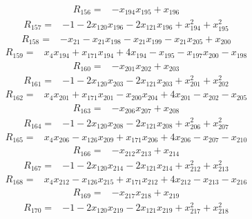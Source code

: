 \[\begin{aligned}R_{156}={}&-x_{194}x_{195}+x_{196}
\end{aligned}\]
\[\begin{aligned}R_{157}={}&-1-2x_{120}x_{196}-2x_{121}x_{196}+x_{194}^{2}+x_{195}^{2}
\end{aligned}\]
\[\begin{aligned}R_{158}={}&-x_{21}-x_{21}x_{198}-x_{21}x_{199}-x_{21}x_{205}+x_{200}
\end{aligned}\]
\[\begin{aligned}R_{159}={}&x_{4}x_{194}+x_{171}x_{194}+4x_{194}-x_{195}-x_{197}x_{200}-x_{198}
\end{aligned}\]
\[\begin{aligned}R_{160}={}&-x_{201}x_{202}+x_{203}
\end{aligned}\]
\[\begin{aligned}R_{161}={}&-1-2x_{120}x_{203}-2x_{121}x_{203}+x_{201}^{2}+x_{202}^{2}
\end{aligned}\]
\[\begin{aligned}R_{162}={}&x_{4}x_{201}+x_{171}x_{201}-x_{200}x_{204}+4x_{201}-x_{202}-x_{205}
\end{aligned}\]
\[\begin{aligned}R_{163}={}&-x_{206}x_{207}+x_{208}
\end{aligned}\]
\[\begin{aligned}R_{164}={}&-1-2x_{120}x_{208}-2x_{121}x_{208}+x_{206}^{2}+x_{207}^{2}
\end{aligned}\]
\[\begin{aligned}R_{165}={}&x_{4}x_{206}-x_{126}x_{209}+x_{171}x_{206}+4x_{206}-x_{207}-x_{210}
\end{aligned}\]
\[\begin{aligned}R_{166}={}&-x_{212}x_{213}+x_{214}
\end{aligned}\]
\[\begin{aligned}R_{167}={}&-1-2x_{120}x_{214}-2x_{121}x_{214}+x_{212}^{2}+x_{213}^{2}
\end{aligned}\]
\[\begin{aligned}R_{168}={}&x_{4}x_{212}-x_{126}x_{215}+x_{171}x_{212}+4x_{212}-x_{213}-x_{216}
\end{aligned}\]
\[\begin{aligned}R_{169}={}&-x_{217}x_{218}+x_{219}
\end{aligned}\]
\[\begin{aligned}R_{170}={}&-1-2x_{120}x_{219}-2x_{121}x_{219}+x_{217}^{2}+x_{218}^{2}
\end{aligned}\]
